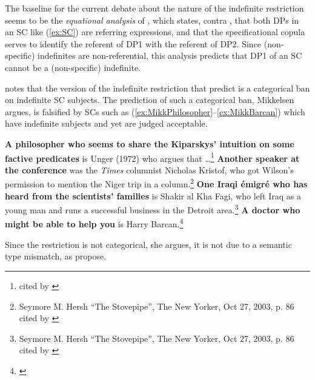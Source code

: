 \documentclass[
]{RCL}
\begin{document}
The baseline for the current debate about the nature of the indefinite restriction seems to be the \textit{equational analysis} of \citet{heycockkroch1999pseudocleft}, which states, contra \citet{moro1997raising}, that both DPs in an SC like (\ref{ex:SC}) are referring expressions, and that the specificational copula serves to identify the referent of DP1 with the referent of DP2.
Since (non-specific) indefinites are non-referential, this analysis predicts that DP1 of an SC cannot be a (non-specific) indefinite.

\citet{mikkelsen2005copular} notes that the version of the indefinite restriction that \citet{heycockkroch1999pseudocleft} predict is a categorical ban on indefinite SC subjects.
The prediction of such a categorical ban, Mikkelsen argues, is falsified by SCs such as (\ref{ex:MikkPhilosopher}--\ref{ex:MikkBarcan}) which have indefinite subjects and yet are judged acceptable. 
\begin{exe}
	\ex\label{ex:MikkPhilosopher} \textbf{A philosopher who seems to share the Kiparskys' intuition on some factive predicates} is Unger (1972) who argues that \dots\footnote{\citet[][p. 195 fn8]{delacruz1976factives} cited by \citet[117]{mikkelsen2005copular}}
	\ex\label{ex:MikkSpeaker} \textbf{Another speaker at the conference} was the \textit{Times} columnist Nicholas Kristof, who got Wilson's permission to mention the Niger trip in a column.\footnote{Seymore M. Hersh ``The Stovepipe'', The New Yorker, Oct 27, 2003, p. 86 cited by \citet[118]{mikkelsen2005copular}}
	\ex\label{ex:MikkEmigre} \textbf{One Iraqi \'emigr\'e who has heard from the scientists' families} is Shakir al Kha Fagi, who left Iraq as a young man and runs a successful business in the Detroit area.\footnote{Seymore M. Hersh ``The Stovepipe'', The New Yorker, Oct 27, 2003, p. 86 cited by \citet[118]{mikkelsen2005copular}}
	\ex\label{ex:MikkBarcan} \textbf{A doctor who might be able to help you} is Harry Barcan.\footnote{\citet[118]{mikkelsen2005copular}}
\end{exe}
Since the restriction is not categorical, she argues, it is not due to a semantic type mismatch, as \citet{heycockkroch1999pseudocleft} propose.
\end{document}
